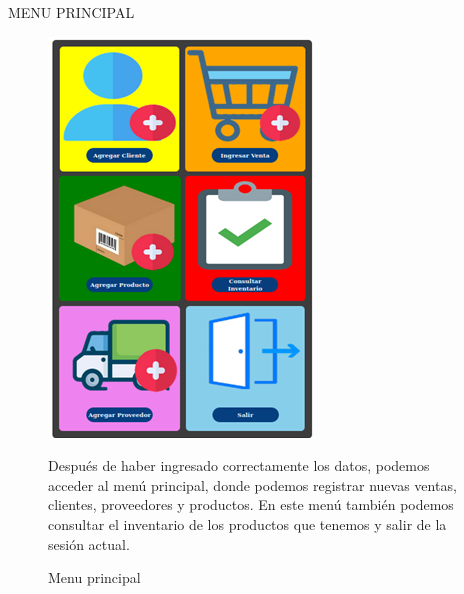 \documentclass{article}
\begin{document}
\begin{center}
MENU PRINCIPAL
\end{center}
\begin{figure}[ht]
\begin{minipage}[t]{0.5\linewidth}
\caption {Menu principal}
\centering
\includegraphics[scale=1]{fig4}
\end{minipage}
\begin{minipage}[t]{0.5\linewidth}
\bigskip
\bigskip
\bigskip
\bigskip
\bigskip
\bigskip
\bigskip
\bigskip
Después de haber ingresado correctamente los datos, podemos acceder al menú principal, donde podemos registrar nuevas ventas, clientes, proveedores y productos. En este menú también podemos consultar el inventario de los productos que tenemos y salir de la sesión actual. 
\end{minipage}
\end{figure}

\pagebreak
\end{document}
